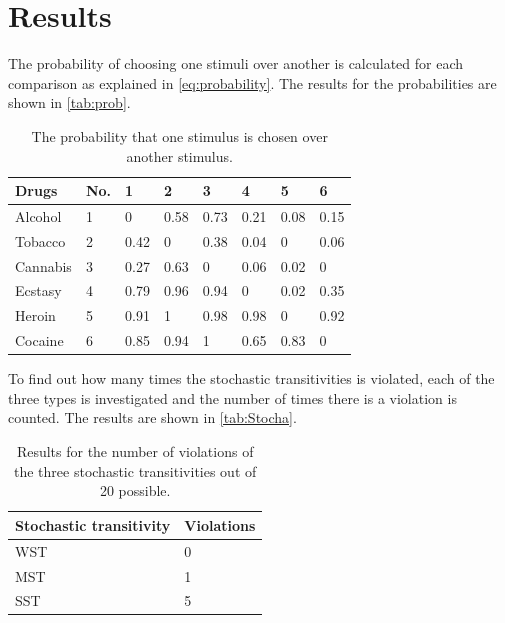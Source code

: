 \section*{Results}
\label{Results}
%
The probability of choosing one stimuli over another is calculated for each comparison as explained in \autoref{eq:probability}. The results for the probabilities are shown in \autoref{tab:prob}. 
%
\begin{table}[H]
\centering
\begin{tabular}{@{}llllllll@{}}
\toprule
Drugs      & No. & 1    & 2    & 3    & 4    & 5    & 6    \\ \midrule
Alcohol    & 1   & 0    & 0.58 & 0.73 & 0.21 & 0.08 & 0.15 \\
Tobacco    & 2   & 0.42 & 0    & 0.38 & 0.04 & 0    & 0.06 \\
Cannabis   & 3   & 0.27 & 0.63 & 0    & 0.06 & 0.02 & 0    \\
Ecstasy    & 4   & 0.79 & 0.96 & 0.94 & 0    & 0.02 & 0.35 \\
Heroin     & 5   & 0.91 & 1    & 0.98 & 0.98 & 0    & 0.92 \\
Cocaine    & 6   & 0.85 & 0.94 & 1    & 0.65 & 0.83 & 0    \\ \bottomrule
\end{tabular}
\caption{The probability that one stimulus is chosen over another stimulus.}
\label{tab:prob}
\end{table} 
\noindent 
%
To find out how many times the stochastic transitivities is violated, each of the three types is investigated and the number of times there is a violation is counted. The results are shown in \autoref{tab:Stocha}. 
%
\begin{table}[H]
\centering
\begin{tabular}{@{}ll@{}}
\toprule
Stochastic transitivity     & Violations \\ \midrule
WST      & 0   \\
MST      & 1   \\
SST      & 5   \\ \bottomrule
\end{tabular}
\caption{Results for the number of violations of the three stochastic transitivities out of 20 possible.}
\label{tab:Stocha}
\end{table}

